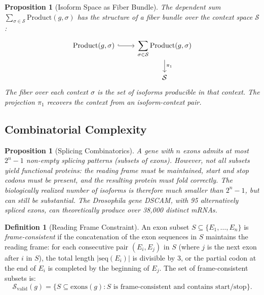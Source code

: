 \documentclass[12pt,a4paper]{article}
\newtheorem{proposition}[theorem]{Proposition}
\theoremstyle{definition}
\newtheorem{definition}[theorem]{Definition}
\begin{document}
\begin{proposition}[Isoform Space as Fiber Bundle]\label{prop:fiber-bundle}
The dependent sum $\sum_{\sigma \in \mathcal{S}} \text{Product}(g, \sigma)$ has the structure of a fiber bundle over the context space $\mathcal{S}$:
\[
\begin{tikzcd}
  \text{Product}(g, \sigma) \arrow[r, hook] & \displaystyle\sum_{\sigma \in \mathcal{S}} \text{Product}(g, \sigma) \arrow[d, "\pi_1"] \\
  & \mathcal{S}
\end{tikzcd}
\]
The fiber over each context $\sigma$ is the set of isoforms producible in that context. The projection $\pi_1$ recovers the context from an isoform-context pair.
\end{proposition}

\subsection{Combinatorial Complexity}

\begin{proposition}[Splicing Combinatorics]\label{prop:splicing-combinatorics}
A gene with $n$ exons admits at most $2^n - 1$ non-empty splicing patterns (subsets of exons). However, not all subsets yield functional proteins: the reading frame must be maintained, start and stop codons must be present, and the resulting protein must fold correctly. The biologically realized number of isoforms is therefore much smaller than $2^n - 1$, but can still be substantial. The \emph{Drosophila} gene \emph{DSCAM}, with 95 alternatively spliced exons, can theoretically produce over 38,000 distinct mRNAs.
\end{proposition}

\begin{definition}[Reading Frame Constraint]\label{def:frame-constraint}
An exon subset $S \subseteq \{E_1, \ldots, E_n\}$ is \emph{frame-consistent} if the concatenation of the exon sequences in $S$ maintains the reading frame: for each consecutive pair $(E_i, E_j)$ in $S$ (where $j$ is the next exon after $i$ in $S$), the total length $|\mathrm{seq}(E_i)|$ is divisible by 3, or the partial codon at the end of $E_i$ is completed by the beginning of $E_j$. The set of frame-consistent subsets is:
\[
  \mathcal{S}_{\mathrm{valid}}(g) = \{S \subseteq \mathrm{exons}(g) : S \text{ is frame-consistent and contains start/stop}\}.
\]
\end{definition}


\end{document}
